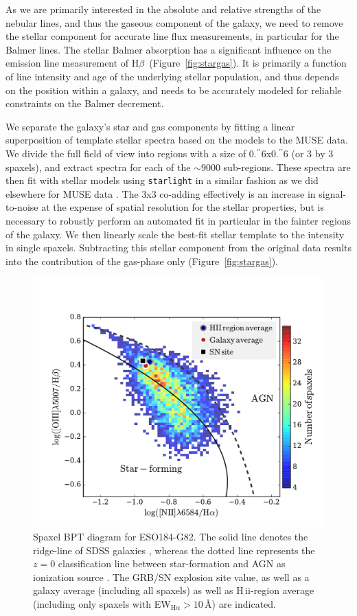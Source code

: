 \documentclass[traditabstract]{aa}
\newcommand{\farc}{\hbox{$.\!\!^{\prime\prime}$}}
\newcommand{\hb}{H$\beta$}
\newcommand{\hii}{\mbox{H\,{\sc ii}}}
\begin{document}
As we are primarily interested in the absolute and relative strengths of the nebular lines, and thus the gaseous component of the galaxy, we need to remove the stellar component for accurate line flux measurements, in particular for the Balmer lines. The stellar Balmer absorption has a significant influence on the emission line measurement of \hb\, (Figure~\ref{fig:stargas}). It is primarily a function of line intensity and age of the underlying stellar population, and thus depends on the position within a galaxy, and needs to be accurately modeled for reliable constraints on the Balmer decrement.

We separate the galaxy's star and gas components by fitting a linear superposition of template stellar spectra based on the \citet{2003MNRAS.344.1000B} models to the MUSE data. We divide the full field of view into regions with a size of 0\farc{6}x0\farc{6} (or 3 by 3 spaxels), and extract spectra for each of the $\sim9000$ sub-regions. These spectra are then fit with stellar models using \texttt{starlight} \citep{2005MNRAS.358..363C, 2009RMxAC..35..127C} in a similar fashion as we did elsewhere for MUSE data \citep{2016MNRAS.455.4087G, 2016arXiv160703446K, 2016arXiv160900013P}. The 3x3 co-adding effectively is an increase in signal-to-noise at the expense of spatial resolution for the stellar properties, but is necessary to robustly perform an automated fit in particular in the fainter regions of the galaxy. We then linearly scale the best-fit stellar template to the intensity in single spaxels. Subtracting this stellar component from the original data results into the contribution of the gas-phase only (Figure~\ref{fig:stargas}).

\begin{figure}
\begin{center}
  \includegraphics[width=0.75\linewidth]{Figs/MUSE_SN1998bw_BPT.pdf}
\caption{Spaxel BPT diagram for ESO184-G82. The solid line denotes the ridge-line of SDSS galaxies \citep{2008MNRAS.385..769B}, whereas the dotted line represents the $z=0$ classification line between star-formation and AGN as ionization source \citep{2013ApJ...774..100K}. The GRB/SN explosion site value, as well as a galaxy average (including all spaxels) as well as \hii-region average (including only spaxels with EW$_{\mathrm{H\alpha}}>10$\,\AA) are indicated.}
\label{fig:BPT}
\end{center}
\end{figure}
\end{document}

